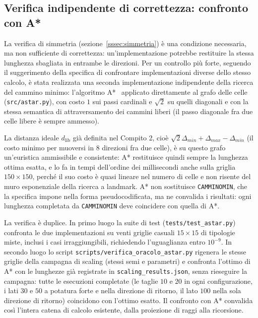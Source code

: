 \subsection{Verifica indipendente di correttezza: confronto con A*}
\label{sec:verifica_astar}

La verifica di simmetria (sezione~\ref{sssec:simmetria}) è una condizione necessaria, ma non sufficiente di correttezza: un'implementazione potrebbe restituire la stessa lunghezza sbagliata in entrambe le direzioni. Per un controllo più forte, seguendo il suggerimento della specifica di confrontare implementazioni diverse dello stesso calcolo, è stata realizzata una seconda implementazione indipendente della ricerca del cammino minimo: l'algoritmo A*~\cite{hart1968} applicato direttamente al grafo delle celle (\texttt{src/astar.py}), con costo $1$ sui passi cardinali e $\sqrt{2}$ su quelli diagonali e con la stessa semantica di attraversamento dei cammini liberi (il passo diagonale fra due celle libere è sempre ammesso).

La distanza ideale $d_{\text{lib}}$ già definita nel Compito 2, cioè $\sqrt{2}\Delta_{min} + \Delta_{max} - \Delta_{min}$ (il costo minimo per muoversi in $8$ direzioni fra due celle), è su questo grafo un'euristica ammissibile e consistente: A* restituisce quindi sempre la lunghezza ottima esatta, e lo fa in tempi dell'ordine dei millisecondi anche sulla griglia $150 \times 150$, perché il suo costo è quasi lineare nel numero di celle e non risente del muro esponenziale della ricerca a landmark. A* non sostituisce \texttt{CAMMINOMIN}, che la specifica impone nella forma pseudocodificata, ma ne convalida i risultati: ogni lunghezza completata da \texttt{CAMMINOMIN} deve coincidere con quella di A*.

La verifica è duplice. In primo luogo la suite di test (\texttt{tests/test\_astar.py}) confronta le due implementazioni su venti griglie casuali $15 \times 15$ di tipologie miste, inclusi i casi irraggiungibili, richiedendo l'uguaglianza entro $10^{-9}$. In secondo luogo lo script \texttt{scripts/verifica\_oracolo\_astar.py} rigenera le stesse griglie della campagna di scaling (stessi semi e parametri) e confronta l'ottimo di A* con le lunghezze già registrate in \texttt{scaling\_results.json}, senza rieseguire la campagna: tutte le esecuzioni completate (le taglie $10$ e $20$ in ogni configurazione, i lati $30$ e $50$ a potatura forte e nella direzione di ritorno, il lato $100$ nella sola direzione di ritorno) coincidono con l'ottimo esatto. Il confronto con A* convalida così l'intera catena di calcolo esistente, dalla proiezione di raggi alla ricorsione.

